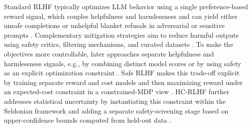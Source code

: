 
Standard RLHF typically optimizes LLM behavior using a single preference-based reward signal, which couples helpfulness and harmlessness and can yield either unsafe completions or unhelpful blanket refusals in adversarial or sensitive prompts \citep{ouyang2022training,bai2022constitutional}. Complementary mitigation strategies aim to reduce harmful outputs using safety critics, filtering mechanisms, and curated datasets \citep{xu2020recipes,thoppilan2022lamda,ziegler2022adversarial}.
To make the objectives more controllable, later approaches separate helpfulness and harmlessness signals, e.g., by combining distinct model scores or by using safety as an explicit optimization constraint \citep{glaese2022improving,mu2024rule,touvron2023llama,ji2023beavertailsimprovedsafetyalignment}.
Safe RLHF makes this trade-off explicit by training separate reward and cost models and then maximizing reward under an expected-cost constraint in a constrained-MDP view \citep{dai2023safe,altman2021constrained}. HC-RLHF further addresses statistical uncertainty by instantiating this constraint within the Seldonian framework and adding a separate safety-screening stage based on upper-confidence bounds computed from held-out data \citep{thomas2019preventing,chittepu2025reinforcement}. %

